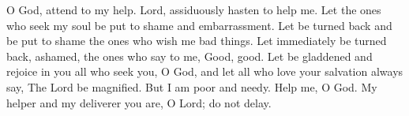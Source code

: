 O God, attend to my help. Lord, assiduously hasten to help me. Let the ones who seek my soul be put to shame and embarrassment. Let be turned back and be put to shame the ones who wish me bad things. Let immediately be turned back, ashamed, the ones who say to me, Good, good. Let be gladdened and rejoice in you all who seek you, O God, and let all who love your salvation always say, The Lord be magnified. But I am poor and needy. Help me, O God. My helper and my deliverer you are, O Lord; do not delay.